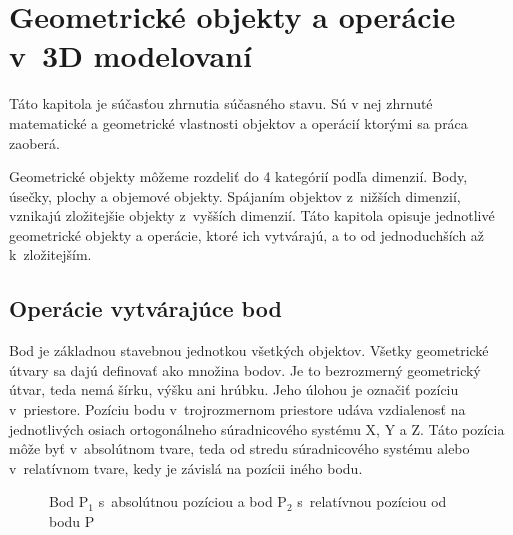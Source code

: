 \chapter{Geometrické objekty a operácie v~3D modelovaní}
\label{chapt:Geometrické_tvary}
Táto kapitola je súčasťou zhrnutia súčasného stavu. Sú v nej zhrnuté matematické a geometrické vlastnosti objektov a operácií ktorými sa práca zaoberá.

Geometrické objekty môžeme rozdeliť do 4 kategórií podľa dimenzií. Body, úsečky, plochy a objemové objekty.
Spájaním objektov z~nižších dimenzií, vznikajú zložitejšie objekty z~vyšších dimenzií. Táto kapitola opisuje jednotlivé geometrické objekty a operácie, ktoré ich vytvárajú, a to od jednoduchších až k~zložitejším.

\section{Operácie vytvárajúce bod }
Bod je základnou stavebnou jednotkou všetkých objektov. Všetky geometrické útvary sa dajú definovať ako množina bodov. Je to bezrozmerný geometrický útvar, teda nemá šírku, výšku ani hrúbku. Jeho úlohou je označiť pozíciu v~priestore. Pozíciu bodu v~trojrozmernom priestore udáva vzdialenosť na jednotlivých osiach ortogonálneho súradnicového systému X, Y a Z. Táto pozícia môže byť v~absolútnom tvare, teda od stredu súradnicového systému alebo v~relatívnom tvare, kedy je závislá na pozícii iného bodu.



\begin{figure}[H]
	\centering
	\caption{Bod P$_1$ s~absolútnou pozíciou a bod P$_2$ s~relatívnou pozíciou od bodu P}
	\label{fig:Point}
\end{figure}

